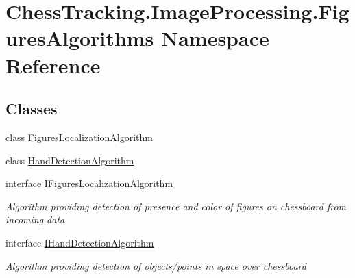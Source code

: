 \hypertarget{namespace_chess_tracking_1_1_image_processing_1_1_figures_algorithms}{}\section{Chess\+Tracking.\+Image\+Processing.\+Figures\+Algorithms Namespace Reference}
\label{namespace_chess_tracking_1_1_image_processing_1_1_figures_algorithms}
\subsection*{Classes}
\begin{DoxyCompactItemize}
\item 
class \mbox{\hyperlink{class_chess_tracking_1_1_image_processing_1_1_figures_algorithms_1_1_figures_localization_algorithm}{Figures\+Localization\+Algorithm}}
\item 
class \mbox{\hyperlink{class_chess_tracking_1_1_image_processing_1_1_figures_algorithms_1_1_hand_detection_algorithm}{Hand\+Detection\+Algorithm}}
\item 
interface \mbox{\hyperlink{interface_chess_tracking_1_1_image_processing_1_1_figures_algorithms_1_1_i_figures_localization_algorithm}{I\+Figures\+Localization\+Algorithm}}
\begin{DoxyCompactList}\small\item\em Algorithm providing detection of presence and color of figures on chessboard from incoming data \end{DoxyCompactList}\item 
interface \mbox{\hyperlink{interface_chess_tracking_1_1_image_processing_1_1_figures_algorithms_1_1_i_hand_detection_algorithm}{I\+Hand\+Detection\+Algorithm}}
\begin{DoxyCompactList}\small\item\em Algorithm providing detection of objects/points in space over chessboard \end{DoxyCompactList}\end{DoxyCompactItemize}

